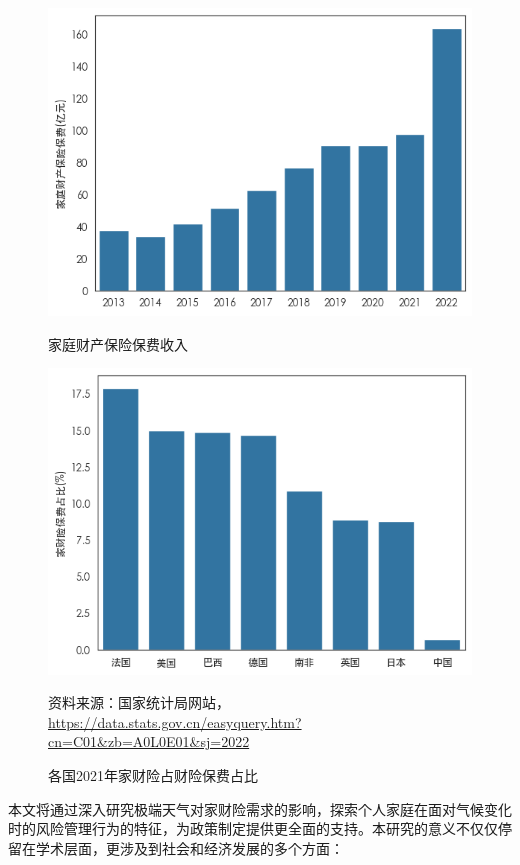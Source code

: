 \begin{figure}[htbp]
    \begin{minipage}{0.48\linewidth}
        \includegraphics[width=\linewidth]{img/家庭财产保险保费.png}
        \caption{家庭财产保险保费收入}
    \end{minipage}
    \begin{minipage}{0.48\linewidth}
        \includegraphics[width=\linewidth]{img/finalimg.png}
        \caption{各国2021年家财险占财险保费占比}
    \end{minipage}
    \qquad {} 资料来源：国家统计局网站，\url{https://data.stats.gov.cn/easyquery.htm?cn=C01&zb=A0L0E01&sj=2022}
\end{figure}


本文将通过深入研究极端天气对家财险需求的影响，探索个人家庭在面对气候变化时的风险管理行为的特征，为政策制定提供更全面的支持。本研究的意义不仅仅停留在学术层面，更涉及到社会和经济发展的多个方面：

